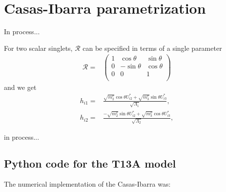 
\section{Casas-Ibarra parametrization}
\label{sec:casas-ibarra}

In process...
 
{\color{red}
For two scalar singlets, $\boldsymbol{\mathcal{R}}$ can be specified in terms of a single parameter 
\begin{align}
  \boldsymbol{\mathcal{R}}=&
  \begin{pmatrix}
    1 & \cos\theta & \sin\theta\\
    0 & -\sin\theta & \cos\theta\\
    0 &   0        & 1         \\ 
  \end{pmatrix}
\end{align}
and we get
\begin{align}
  h_{i1}=&\frac{\sqrt{m^\nu_2}\cos\theta U^{*}_{i2}+ \sqrt{m^\nu_3}\sin\theta U^{*}_{i3}}%
{\sqrt{\Lambda_1}},\nonumber\\
h_{i2}=&\frac{-\sqrt{m^\nu_2}\sin\theta U^{*}_{i2}+ \sqrt{m^\nu_3}\cos\theta U^{*}_{i3}}%
{\sqrt{\Lambda_2}},
\end{align}
}

in process...

\subsection{Python code for the T13A model}
The numerical implementation of the Casas-Ibarra was:




